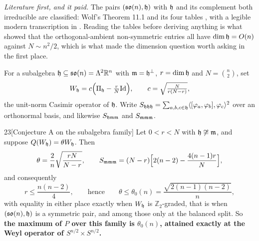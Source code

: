 \emph{Literature first, and it paid.} The pairs $(\mathfrak{so}(n),\mathfrak{h})$ with $\mathfrak{h}$ and its complement both irreducible are classified: Wolf's Theorem 11.1 and its four tables \cite{wolf1968}, with a legible modern transcription in \cite{lauret2025}. Reading the tables before deriving anything is what showed that the orthogonal-ambient non-symmetric entries all have $\dim\mathfrak{h}=O(n)$ against $N\sim n^2/2$, which is what made the dimension question worth asking in the first place.

For a subalgebra $\mathfrak{h}\subseteq\mathfrak{so}(n)=\Lambda^2\mathbb{R}^n$ with $\mathfrak{m}=\mathfrak{h}^\perp$, $r=\dim\mathfrak{h}$ and $N=\binom n2$, set
\[
W_{\mathfrak{h}}=c\Big(\Pi_{\mathfrak{h}}-\tfrac rN\mathrm{Id}\Big),\qquad c=\sqrt{\tfrac{N}{r(N-r)}},
\]
the unit-norm Casimir operator of $\mathfrak{h}$. Write $S_{\mathfrak{h}\mathfrak{h}\mathfrak{h}}=\sum_{a,b,c\in\mathfrak{h}}\langle[\varphi_a,\varphi_b],\varphi_c\rangle^2$ over an orthonormal basis, and likewise $S_{\mathfrak{h}\mathfrak{m}\mathfrak{m}}$ and $S_{\mathfrak{m}\mathfrak{m}\mathfrak{m}}$.

\begin{Lem}{23}[Conjecture A on the subalgebra family]
Let $0<r<N$ with $\mathfrak{h}\not\cong\mathfrak{m}$, and suppose $Q(W_{\mathfrak{h}})=\theta W_{\mathfrak{h}}$. Then
\[
\theta=\frac2n\sqrt{\frac{rN}{N-r}},\qquad
S_{\mathfrak{m}\mathfrak{m}\mathfrak{m}}=(N-r)\Big[2(n-2)-\frac{4(n-1)r}{N}\Big],
\]
and consequently
\[
r\le\frac{n(n-2)}4,\qquad\text{hence}\qquad \theta\le\theta_0(n)=\frac{\sqrt{2(n-1)(n-2)}}n,
\]
with equality in either place exactly when $W_{\mathfrak{h}}$ is $\mathbb Z_2$-graded, that is when $(\mathfrak{so}(n),\mathfrak{h})$ is a symmetric pair, and among those only at the balanced split. So \textbf{the maximum of $P$ over this family is $\theta_0(n)$, attained exactly at the Weyl operator of $S^{n/2}\times S^{n/2}$.}
\end{Lem}

